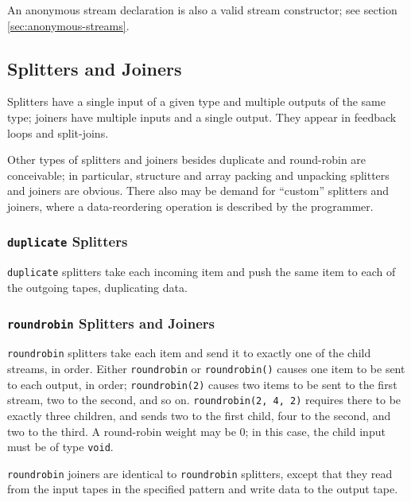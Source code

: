 \documentclass[11pt]{article}
\begin{document}
An anonymous stream declaration is also a valid stream constructor;
see section \ref{sec:anonymous-streams}.

\subsection{Splitters and Joiners}
\label{sec:expr-splitters-joiners}

Splitters have a single input of a given type and multiple outputs of
the same type; joiners have multiple inputs and a single output.  They
appear in feedback loops and split-joins.

\begin{note}
  Other types of splitters and joiners besides duplicate and
  round-robin are conceivable; in particular, structure and array
  packing and unpacking splitters and joiners are obvious.  There also
  may be demand for ``custom'' splitters and joiners, where a
  data-reordering operation is described by the programmer.
\end{note}

\subsubsection{\lstinline|duplicate| Splitters}
\label{sec:expr-duplicate}

\lstinline|duplicate| splitters take each incoming item and push the
same item to each of the outgoing tapes, duplicating data.

\subsubsection{\lstinline|roundrobin| Splitters and Joiners}
\label{sec:expr-round-robin}

\lstinline|roundrobin| splitters take each item and send it to exactly
one of the child streams, in order.  Either \lstinline|roundrobin| or
\lstinline|roundrobin()| causes one item to be sent to each output, in
order; \lstinline|roundrobin(2)| causes two items to be sent to the first
stream, two to the second, and so on.  \lstinline|roundrobin(2, 4, 2)|
requires there to be exactly three children, and sends two to the
first child, four to the second, and two to the third.  A round-robin
weight may be 0; in this case, the child input must be of type
\lstinline|void|.

\lstinline|roundrobin| joiners are identical to \lstinline|roundrobin|
splitters, except that they read from the input tapes in the specified
pattern and write data to the output tape.
\end{document}

